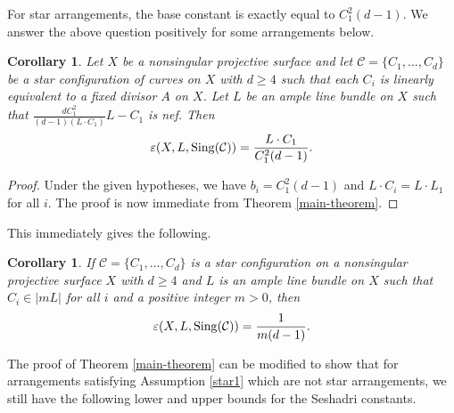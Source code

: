 \documentclass[12pt,reqno]{amsart}
\theoremstyle{plain}
\numberwithin{equation}{section}
\newtheorem{corollary}[theorem]{Corollary}
\theoremstyle{definition}
\begin{document}
	For star arrangements, the base constant is exactly equal to $C_1^2(d-1)$. We answer the above question positively for some arrangements below.  
 



 
	
	\begin{corollary}
		\label{prop:star} Let $X$ be a nonsingular projective surface and let $\mathcal{C} = \{C_{1}, \ldots, C_{d}\}$ be a star configuration of curves on $X$ with $d \geq 4$ such that each $ C_i$ is linearly equivalent to a fixed divisor $A$ on $X$. Let $L$ be an ample line bundle on $X$
		such that  $\frac{dC_1^2}{(d-1)(L\cdot C_1)}L-C_1$ is nef.   Then 
		$$\varepsilon(X, L,{\rm Sing}(\mathcal{C})) = \frac{L\cdot C_1}{C_1^2(d-1)}.$$
	\end{corollary}

 \begin{proof}
Under the given hypotheses, we have $b_i = C_1^2(d-1)$  and $L\cdot C_i = L\cdot L_1$
for all $i$. 
The proof is now immediate from Theorem \ref{main-theorem}.    
 \end{proof} This immediately gives the following. 


	\begin{corollary}
		\label{coro:star}
		If $\mathcal{C} = \{C_{1}, \ldots, C_{d}\}$ is a star configuration on a nonsingular projective surface $X$ with $d \geq 4$  and $L$ is an ample line bundle  on $X$ such that $ C_i \in |mL|$ for all $i$ and a positive integer $m>0$, then 
		$$\varepsilon(X, L,{\rm Sing}(\mathcal{C})) = \frac{1}{m(d-1)}.$$
	\end{corollary}




The proof of Theorem \ref{main-theorem} can be modified to show that for arrangements
satisfying Assumption \ref{star1} which are not star arrangements, we still have the following lower and upper bounds for the Seshadri constants. 
\end{document}

